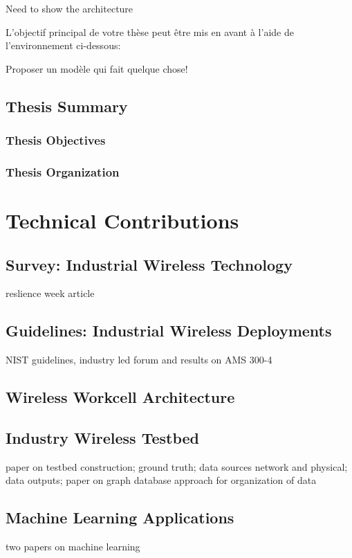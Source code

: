 \documentclass[english]{spimubphdthesis}
\begin{document}
Need to show the architecture

L'objectif principal de votre thèse peut être mis en avant à l'aide de l'environnement ci-dessous:

\begin{emphbox}
	Proposer un modèle qui fait quelque chose!
\end{emphbox}

\chapter{Thesis Summary}

\section{Thesis Objectives}

\section{Thesis Organization}


\part{Technical Contributions}
\chapter{Survey: Industrial Wireless Technology}
reslience week article
\chapter{Guidelines: Industrial Wireless Deployments}
NIST guidelines, industry led forum and results on AMS 300-4
\chapter{Wireless Workcell Architecture}






\chapter{Industry Wireless Testbed}
paper on testbed construction; ground truth; data sources network and physical; data outputs; paper on graph database approach for organization of data
\chapter{Machine Learning Applications}
two papers on machine learning
\end{document}
